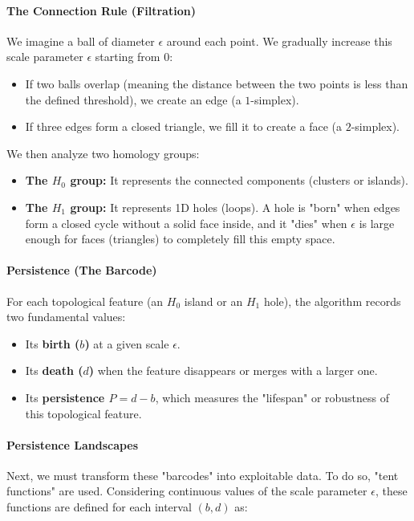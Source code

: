 \documentclass{article}
\begin{document}
\paragraph{The Connection Rule (Filtration)}
We imagine a ball of diameter $\epsilon$ around each point. We gradually increase this scale parameter $\epsilon$ starting from $0$:
\begin{itemize}
    \item If two balls overlap (meaning the distance between the two points is less than the defined threshold), we create an edge (a $1$-simplex).
    \item If three edges form a closed triangle, we fill it to create a face (a $2$-simplex).
\end{itemize}

We then analyze two homology groups:
\begin{itemize}
    \item \textbf{The $H_0$ group:} It represents the connected components (clusters or islands).
    \item \textbf{The $H_1$ group:} It represents 1D holes (loops). A hole is "born" when edges form a closed cycle without a solid face inside, and it "dies" when $\epsilon$ is large enough for faces (triangles) to completely fill this empty space.
\end{itemize}

\paragraph{Persistence (The Barcode)}
For each topological feature (an $H_0$ island or an $H_1$ hole), the algorithm records two fundamental values:
\begin{itemize}
    \item Its \textbf{birth ($b$)} at a given scale $\epsilon$.
    \item Its \textbf{death ($d$)} when the feature disappears or merges with a larger one.
    \item Its \textbf{persistence $P = d - b$}, which measures the "lifespan" or robustness of this topological feature.
\end{itemize}

\paragraph{Persistence Landscapes}
Next, we must transform these "barcodes" into exploitable data. To do so, "tent functions" are used. Considering continuous values of the scale parameter $\epsilon$, these functions are defined for each interval $(b,d)$ as:
\end{document}
